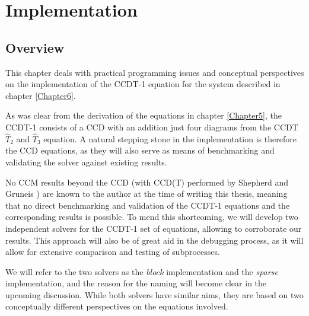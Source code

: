 
\chapter{Implementation} %

\label{Chapter7} %



\section{Overview}

This chapter deals with practical programming issues and conceptual perspectives on the implementation of the CCDT-1 equation for the system described in chapter \ref{Chapter6}.

As was clear from the derivation of the equations in chapter
\ref{Chapter5}, the CCDT-1 consists of a CCD with an addition just four
diagrams from the CCDT $\hat{T}_2$ and $\hat{T}_3$ equation. A natural stepping
stone in the implementation is therefore the CCD equations, as they
will also serve as means of benchmarking and validating the solver
against existing results.

No CCM results beyond the CCD (with CCD(T) performed by Shepherd and
Gruneis \cite{Shepherd2013c}) are known to the author at the time of
writing this thesis, meaning that no direct benchmarking and validation of the CCDT-1 equations and the corresponding results is possible. To mend this shortcoming, we will
develop two independent solvers for the CCDT-1 set of equations, allowing to
corroborate  our results. This approach will also be
of great aid in the debugging process, as it will allow for extensive
comparison and testing of subprocesses.

We will refer to the two solvers as the \emph{block} implementation
and the \emph{sparse} implementation, and the reason for the naming
will become clear in the upcoming discussion. While both solvers have
similar aims, they are based on two conceptually different
perspectives on the equations involved.

